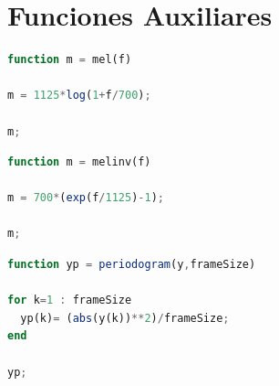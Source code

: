 \documentclass[a4paper,10pt]{article}
\begin{document}
\section{Funciones Auxiliares}

\begin{lstlisting}[language=Octave, caption = Mel]
function m = mel(f)

m = 1125*log(1+f/700);

m;
\end{lstlisting}

\begin{lstlisting}[language=Octave, caption = Mel Inversa]
function m = melinv(f)

m = 700*(exp(f/1125)-1);

m;
\end{lstlisting}

\begin{lstlisting}[language=Octave, caption = Periodogram]
function yp = periodogram(y,frameSize)

for k=1 : frameSize
  yp(k)= (abs(y(k))**2)/frameSize;
end

yp;
\end{lstlisting}

\pagebreak

\tableofcontents
\end{document}
